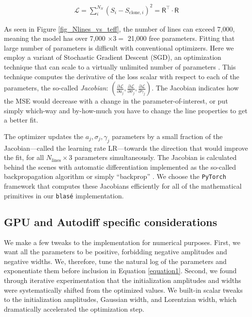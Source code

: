 \documentclass[modern]{aastex631}
\begin{document}
\begin{eqnarray}
    \mathcal{L} = \sum_i^{N_S} (S_i - S_{\mathrm{clone},i})^2 = \mathsf{R^\intercal}\cdot \mathsf{R}
\end{eqnarray}


As seen in Figure \ref{fig_Nlines_vs_teff}, the number of lines can exceed 7,000, meaning the model has over 7,000 $\times 3 =$ 21,000 free parameters. Fitting that large number of parameters is difficult with conventional optimizers.  Here we employ a variant of Stochastic Gradient Descent (SGD), an optimization technique that can scale to a virtually unlimited number of parameters \citep{2016arXiv160904747R}. This technique computes the derivative of the loss scalar with respect to each of the parameters, the so-called \emph{Jacobian}: $(\frac{\partial \mathcal{L}}{\partial a_j}, \frac{\partial \mathcal{L}}{\partial \sigma_j}, \frac{\partial \mathcal{L}}{\partial \gamma_j})$. The Jacobian indicates how the MSE would decrease with a change in the parameter-of-interest, or put simply which-way and by-how-much you have to change the line properties to get a better fit.

The optimizer updates the $a_j, \sigma_j, \gamma_j$ parameters by a small fraction of the Jacobian---called the learning rate LR---towards the direction that would improve the fit, for all $N_{\mathrm{lines}} \times 3$ parameters simultaneously. The Jacobian is calculated behind the scenes with automatic differentiation implemented as the so-called backpropagation algorithm or simply ``backprop'' \citep{2015arXiv150205767G}. We choose the \texttt{PyTorch} framework that computes these Jacobians efficiently for all of the mathematical primitives in our \texttt{blas\'e} implementation.


\subsection{GPU and Autodiff specific considerations}
We make a few tweaks to the implementation for numerical purposes. First, we want all the parameters to be positive, forbidding negative amplitudes and negative widths. We, therefore, tune the natural log of the parameters and exponentiate them before inclusion in Equation \ref{equation1}. Second, we found through iterative experimentation that the initialization amplitudes and widths were systematically shifted from the optimized values. We built-in scalar tweaks to the initialization amplitudes, Gaussian width, and Lorentzian width, which dramatically accelerated the optimization step.
\end{document}
